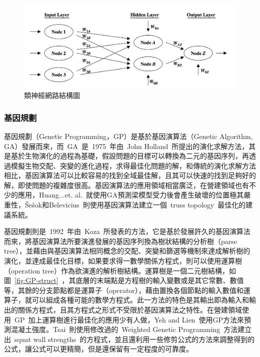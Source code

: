 \begin{figure}[hbtp]
  \begin{center}
    \includegraphics[width=1.0\textwidth]{figures/anns-network.png}
    \caption{類神經網路結構圖~\cite{larose2005discovering}} 
    \label{fig:ANN-network}
  \end{center}
\end{figure}

\subsubsection{基因規劃}

基因規劃（Genetic Programming，GP）是基於基因演算法（Genetic Algorithm, GA）發展而來，而~GA~是~1975~年由~John Holland\cite{holland1975adaptation}~所提出的演化求解方法，其是基於生物演化的過程為基礎，假設問題的目標可以轉換為二元的基因序列，再透過模擬生物交配、突變的進化過程，求得最佳化問題的解，和傳統的演化求解方法相比，基因演算法可以比較容易的找到全域最佳解，且其可以快速的找到足夠好的解，即使問題的複雜度很高。基因演算法的應用領域相當廣泛，在營建領域也有不少的應用，Huang...et. al.\cite{minshui2009study}~就使用GA預測梁模型受力後會產生破壞的位置極其嚴重性，Šešok和Belevicius\cite{vsevsok2008global}~則使用基因演算法建立一個~truss topology~最佳化的建議系統。

基因規劃則是~1992~年由~Koza\cite{koza1992genetic}~所發表的方法，它是基於發展許久的基因演算法而來，將基因演算法所要演進發展的基因序列換為樹狀結構的分析樹（parse tree），並藉由與基因演算法相同概念的交配、突變和篩選等機制來達成解析樹的演化，並達成最佳化目標，如果要求得一數學關係方程式，則可以使用運算樹（operation tree）作為欲演進的解析樹結構。運算樹是一個二元樹結構，如圖~\ref{fig:GP-struct}~，其底層的末端點是方程樹的輸入變數或是其它常數、數值等，其餘的分支節點都是運算子（operator），藉由置換各個節點的輸入數值和運算子，就可以組成各種可能的數學方程式。此一方法的特色是其輸出即為輸入和輸出的關係方程式，且其方程式之形式不受限於基因演算法之特性。在營建領域使用~GP~加上運算樹進行最佳化的應用少有人做，Yeh and Lien\cite{yeh2009knowledge}~使用GP方法來預測混凝土強度。Tsai\cite{tsai2011using}~則使用修改過的~Weighted Genetic Programming~方法建立出~squat wall strengths~的方程式，並且還利用一些修剪公式的方法來調整得到的公式，讓公式可以更精簡，但是還保留有一定程度的可靠度。

